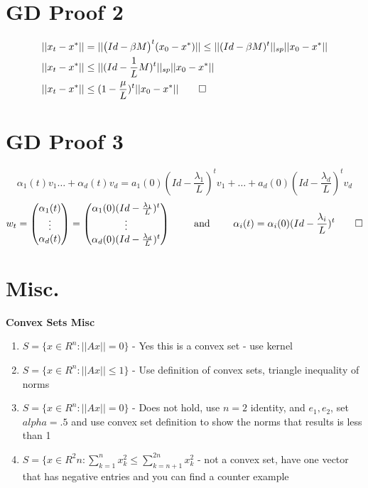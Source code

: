 \documentclass[12pt,twoside]{article}
\newcommand{\Id}{Id}
\begin{document}
\section*{GD Proof 2}
\begin{equation}
    \begin{split} 
        ||x_{t} - x^*|| &= ||\big(\Id - \beta M \big)^t(x_0 - x^*)|| \leq ||(\Id - \beta M )^t ||_{sp} || x_0 - x^* ||\\
        ||x_{t} - x^*|| &\leq ||(\Id - \frac{1}{L} M )^t ||_{sp} || x_0 - x^* ||\\
        ||x_{t} - x^*|| &\leq (1 - \frac{\mu}{L} )^t || x_0 - x^* || \qed
    \end{split}
\end{equation}
\section*{GD Proof 3}
$$
    \alpha_1(t)v_1  \dots + \alpha_d(t) v_d = a_1(0) (Id-\frac{\lambda_1}{L})^tv_1 + \dots + a_d(0) (Id-\frac{\lambda_d}{L})^tv_d
$$  
$$
w_t = \begin{pmatrix} 
\alpha_1(t)\\
\vdots \\ 
\alpha_d(t)
\end{pmatrix} = \begin{pmatrix} 
\alpha_1(0)(Id-\frac{\lambda_1}{L})^t\\
\vdots \\ 
\alpha_d(0)(Id-\frac{\lambda_d}{L})^t
\end{pmatrix} \qquad 
\text{ and } \qquad \alpha_i(t) = \alpha_i(0)(Id-\frac{\lambda_i}{L})^t \qed
$$

\section*{Misc.}
\textbf{Convex Sets Misc}
\begin{enumerate}
    \item $S = \{ x \in R^n: ||Ax|| = 0\}$ - Yes this is a convex set - use kernel
    \item $S = \{ x \in R^n: ||Ax|| \leq 1 \}$ - Use definition of convex sets, triangle inequality of norms
    \item $S = \{ x \in R^n: ||Ax|| = 0\}$ - Does not hold, use $n=2$ identity, and $e_1,e_2$, set $alpha = .5$ and use convex set definition to show the norms that results is less than 1
    \item $S = \{ x \in R^2n: \sum_{k=1}^n x_k^2 \leq \sum_{k=n+1}^{2n} x^2_k$ - not a convex set, have one vector that has negative entries and you can find a counter example
\end{enumerate}
\end{document}
